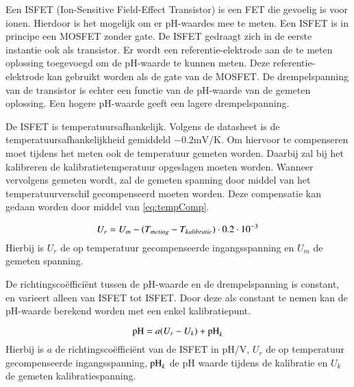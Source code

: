 Een ISFET (Ion-Sensitive Field-Effect Transistor) is een FET die gevoelig is voor ionen. Hierdoor is het mogelijk om er pH-waardes mee te meten\cite{modeling}. Een ISFET is in principe een MOSFET zonder gate. De ISFET gedraagt zich in de eerste instantie ook als transistor. Er wordt een referentie-elektrode aan de te meten oplossing toegevoegd om de pH-waarde te kunnen meten. Deze referentie-elektrode kan gebruikt worden als de gate van de MOSFET\cite{van1987isfet}. De drempelspanning van de transistor is echter een functie van de pH-waarde van de gemeten oplossing. Een hogere pH-waarde geeft een lagere drempelspanning\cite{isfet}.

De ISFET is temperatuursafhankelijk\cite{isfet}. Volgens de datasheet is de temperatuursafhankelijkheid gemiddeld $-0.2\si{\milli\volt\per\kelvin}$\cite{Microsens-MSFET}. Om hiervoor te compenseren moet tijdens het meten ook de temperatuur gemeten worden. Daarbij zal bij het kalibreren de kalibratietemperatuur opgeslagen moeten worden. Wanneer vervolgens gemeten wordt, zal de gemeten spanning door middel van het temperatuurverschil gecompenseerd moeten worden. Deze compensatie kan gedaan worden door middel van \cref{eq:tempComp}.

\begin{equation}\label{eq:tempComp}
    U_r = U_m - (T_{meting} - T_{kalibratie}) \cdot 0.2 \cdot 10^{-3}
    \tagaddtext{[\si{\volt}]}
\end{equation}
Hierbij is $U_r$ de op temperatuur gecompenseerde ingangsspanning en $U_m$ de gemeten spanning.

De richtingscoëfficiënt tussen de pH-waarde en de drempelspanning is constant, en varieert alleen van ISFET tot ISFET. Door deze als constant te nemen kan de pH-waarde berekend worden met een enkel kalibratiepunt.

\begin{equation}\label{eq:calcPH}
    \ph = a(U_r - U_k) + \ph_k
    \tagaddtext{[pH]}
\end{equation}
Hierbij is $a$ de richtingscoëfficiënt van de ISFET in pH/V, $U_r$ de op temperatuur gecompenseerde ingangsspanning, $\mathrm{pH}_k$ de pH waarde tijdens de kalibratie en $U_k$ de gemeten kalibratiespanning.